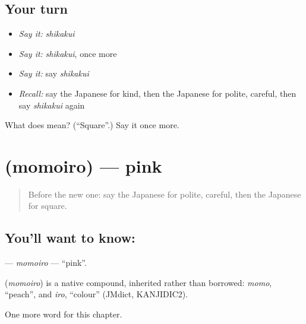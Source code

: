 \subsection*{Your turn}
\begin{itemize}
\raggedright
  \item \emph{Say it:} \emph{shikakui}
  \item \emph{Say it:} \emph{shikakui}, once more
  \item \emph{Say it:} say \emph{shikakui}
  \item \emph{Recall:} say the Japanese for kind, then the Japanese for polite, careful, then say \emph{shikakui} again
\end{itemize}

\begin{tcolorbox}[breakable,colback=teal!4,colframe=teal!35!black,title={Before you move on}]
What does  mean? (\textquotedblleft{}Square\textquotedblright{}.) Say it once more.
\end{tcolorbox}
\section[\texorpdfstring{\ja{ももいろ} (momoiro)}{ももいろ (momoiro)}]{ (momoiro) — pink}

\label{lesson:JA-C121-momoiro}



\begin{quote}
Before the new one: say the Japanese for polite, careful, then the Japanese for square.
\end{quote}

\subsection*{You'll want to know: }
\textbf{} — \emph{momoiro} — \textquotedblleft{}pink\textquotedblright{}.

\begin{cousinweb}
\textbf{} (\emph{momoiro}) is a native compound, inherited rather than borrowed: \emph{momo}, \textquotedblleft{}peach\textquotedblright{}, and \emph{iro}, \textquotedblleft{}colour\textquotedblright{} (JMdict, KANJIDIC2).
\end{cousinweb}

\begin{grammarlens}[title={What you've built}]
One more word for this chapter.
\end{grammarlens}

